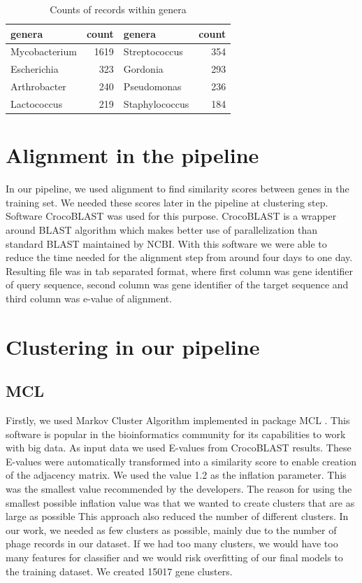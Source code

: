 \begin{table}
 \centering
        \begin{tabular}{ l  r  l  r }
         \hline
         genera & count & genera & count \\
         \hline
         Mycobacterium & 1619 & Streptococcus & 354 \\
         Escherichia & 323 & Gordonia & 293 \\
         Arthrobacter & 240 & Pseudomonas & 236 \\
         Lactococcus & 219 & Staphylococcus & 184 \\
         \hline
        \end{tabular}
        \caption{Counts of records within genera}
        \label{tab:counts}
\end{table}

\section{Alignment in the pipeline}
In our pipeline, we used alignment to find similarity scores between genes in the training set.
We needed these scores later in the pipeline at clustering step.
Software CrocoBLAST \cite{} was used for this purpose.
CrocoBLAST is a wrapper around BLAST algorithm which makes better use of parallelization than standard BLAST maintained by NCBI.
With this software we were able to reduce the time needed for the alignment step from around four days to one day.
Resulting file was in tab separated format, where first column was gene identifier of query sequence, second column was gene identifier of the target sequence and third column was e-value of alignment.

\section{Clustering in our pipeline}
\subsection{MCL}
Firstly, we used Markov Cluster Algorithm implemented in package MCL \cite{mcl}.
This software is popular in the bioinformatics community for its capabilities to work with big data.
As input data we used E-values from CrocoBLAST results.
These E-values were automatically transformed into a similarity score to enable creation of the adjacency matrix.
We used the value 1.2 as the inflation parameter.
This was the smallest value recommended by the developers.
The reason for using the smallest possible inflation value was that we wanted to create clusters that are as large as possible
This approach also reduced the number of different clusters.
In our work, we needed as few clusters as possible, mainly due to the number of phage records in our dataset.
If we had too many clusters, we would have too many features for classifier and we would risk overfitting of our final models to the training dataset.
We created 15017 gene clusters.

